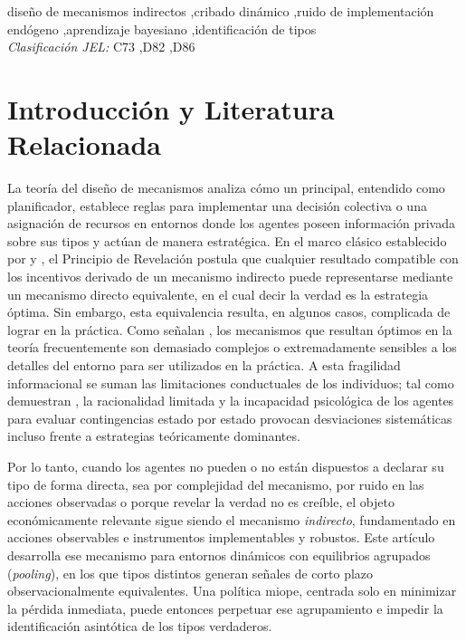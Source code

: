 \documentclass[review,authoryear,12pt]{elsarticle}
\theoremstyle{plain}
\theoremstyle{definition}
\newcommand{\1}{\mathbf{1}}
\begin{document}
\begin{frontmatter}
\begin{keyword}
diseño de mecanismos indirectos \sep cribado dinámico \sep ruido de implementación endógeno \sep aprendizaje bayesiano \sep identificación de tipos \\
\textit{Clasificación JEL:} C73 \sep D82 \sep D86
\end{keyword}

\end{frontmatter}

\section{Introducción y Literatura Relacionada}\label{sec:intro}

La teoría del diseño de mecanismos analiza cómo un principal, entendido como planificador, establece reglas para implementar una decisión colectiva o una asignación de recursos en entornos donde los agentes poseen información privada sobre sus tipos y actúan de manera estratégica. En el marco clásico establecido por \citet{Gibbard1973} y \citet{Myerson1979IC,Myerson1981}, el Principio de Revelación postula que cualquier resultado compatible con los incentivos derivado de un mecanismo indirecto puede representarse mediante un mecanismo directo equivalente, en el cual decir la verdad es la estrategia óptima. Sin embargo, esta equivalencia resulta, en algunos casos, complicada de lograr en la práctica. Como señalan \citet{BergemannMorris2012}, los mecanismos que resultan óptimos en la teoría frecuentemente son demasiado complejos o extremadamente sensibles a los detalles del entorno para ser utilizados en la práctica. A esta fragilidad informacional se suman las limitaciones conductuales de los individuos; tal como demuestran \citet{ZhangLevin2017}, la racionalidad limitada y la incapacidad psicológica de los agentes para evaluar contingencias estado por estado provocan desviaciones sistemáticas incluso frente a estrategias teóricamente dominantes.

Por lo tanto, cuando los agentes no pueden o no están dispuestos a declarar su tipo de forma directa, sea por complejidad del mecanismo, por ruido en las acciones observadas o porque revelar la verdad no es creíble, el objeto económicamente relevante sigue siendo el mecanismo \emph{indirecto}, fundamentado en acciones observables e instrumentos implementables y robustos. Este artículo desarrolla ese mecanismo para entornos dinámicos con equilibrios agrupados (\emph{pooling}), en los que tipos distintos generan señales de corto plazo observacionalmente equivalentes. Una política miope, centrada solo en minimizar la pérdida inmediata, puede entonces perpetuar ese agrupamiento e impedir la identificación asintótica de los tipos verdaderos.
\end{document}
